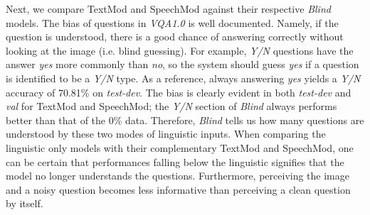 \documentclass[letterpaper]{article} %
\begin{document}
Next, we compare TextMod and SpeechMod against their respective \textit{Blind} models. The bias of questions in \textit{VQA1.0} is well documented. Namely, if the question is understood, there is a good chance of answering correctly without looking at the image (i.e. blind guessing). For example, \textit{Y/N} questions have the answer \emph{yes} more commonly than \emph{no}, so the system should guess \emph{yes} if a question is identified to be a \textit{Y/N} type. As a reference, always answering \emph{yes} yields a \textit{Y/N} accuracy of 70.81\% on \textit{test-dev}. The bias is clearly evident in both \textit{test-dev} and \textit{val} for TextMod and SpeechMod; the \textit{Y/N} section of \textit{Blind} always performs better than that of the 0\% data. Therefore, \textit{Blind} tells us how many questions are understood by these two modes of linguistic inputs. When comparing the linguistic only models with their complementary TextMod and SpeechMod, one can be certain that performances falling below the linguistic signifies that the model no longer understands the questions. Furthermore, perceiving the image and a noisy question becomes less informative than perceiving a clean question by itself.
\end{document}

